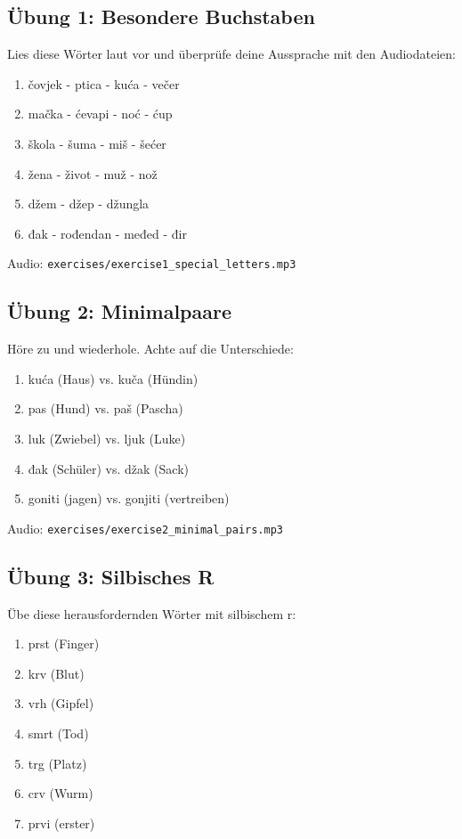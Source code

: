 \subsection{Übung 1: Besondere Buchstaben}

Lies diese Wörter laut vor und überprüfe deine Aussprache mit den Audiodateien:

\begin{enumerate}
    \item čovjek - ptica - kuća - večer
    \item mačka - ćevapi - noć - ćup
    \item škola - šuma - miš - šećer
    \item žena - život - muž - nož
    \item džem - džep - džungla
    \item đak - rođendan - međed - đir
\end{enumerate}

Audio: \texttt{exercises/exercise1\_special\_letters.mp3}

\subsection{Übung 2: Minimalpaare}

Höre zu und wiederhole. Achte auf die Unterschiede:

\begin{enumerate}
    \item kuća (Haus) vs. kuča (Hündin)
    \item pas (Hund) vs. paš (Pascha)
    \item luk (Zwiebel) vs. ljuk (Luke)
    \item đak (Schüler) vs. džak (Sack)
    \item goniti (jagen) vs. gonjiti (vertreiben)
\end{enumerate}

Audio: \texttt{exercises/exercise2\_minimal\_pairs.mp3}

\subsection{Übung 3: Silbisches R}

Übe diese herausfordernden Wörter mit silbischem \glqq r\grqq{}:

\begin{enumerate}
    \item prst (Finger)
    \item krv (Blut)
    \item vrh (Gipfel)
    \item smrt (Tod)
    \item trg (Platz)
    \item crv (Wurm)
    \item prvi (erster)
\end{enumerate}

